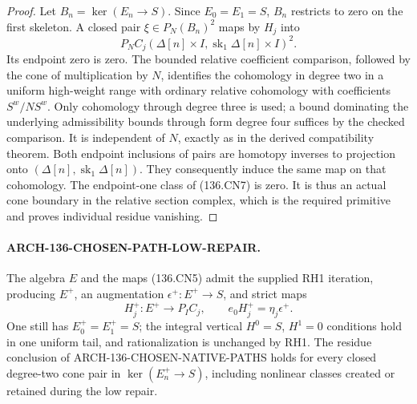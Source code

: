 \begin{proof}
Let \(B_n=\ker(E_n\to S)\).  Since \(E_0=E_1=S\),
\(B_n\) restricts to zero on the first skeleton.  A closed
pair \(\xi\in P_N(B_n)^2\) maps by \(H_j\) into
\[
             P_N C_j(\Delta[n]\times I,
                        \operatorname{sk}_1\Delta[n]\times I)^2.
                                                               \tag{136.CN7}
\]
Its endpoint zero is zero.  The bounded relative coefficient
comparison, followed by the cone of multiplication by \(N\),
identifies the cohomology in degree two in a uniform high-weight
range with ordinary relative cohomology with coefficients
\(S^w/NS^w\).  Only cohomology through degree three is
used; a bound dominating the underlying admissibility bounds
through form degree four suffices by the checked comparison.
It is independent of \(N\), exactly as in the derived
compatibility theorem.  Both endpoint inclusions of pairs are
homotopy inverses to projection onto \((\Delta[n],\operatorname{sk}_1\Delta[n])\).
They consequently induce the same map on that cohomology.
The endpoint-one class of (136.CN7) is zero.  It is thus an
actual cone boundary in the relative section complex, which
is the required primitive and proves individual residue vanishing.
\end{proof}

\paragraph{ARCH-136-CHOSEN-PATH-LOW-REPAIR.}
The algebra \(E\) and the maps (136.CN5) admit the supplied
RH1 iteration, producing \(E^+\), an augmentation
\(\epsilon^+:E^+\to S\), and strict maps
\[
 H_j^+:E^+\longrightarrow P_I C_j,
             \qquad e_0H_j^+=\eta_j\epsilon^+.
                                                               \tag{136.CN8}
\]
One still has \(E^+_0=E^+_1=S\); the integral vertical
\(H^0=S\), \(H^1=0\) conditions hold in one uniform
tail, and rationalization is unchanged by RH1.
The residue conclusion of ARCH-136-CHOSEN-NATIVE-PATHS holds
for every closed degree-two cone pair in
\(\ker(E_n^+\to S)\), including nonlinear classes created
or retained during the low repair.

